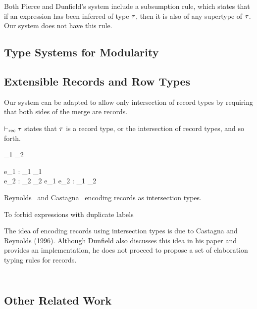 Both Pierce and Dunfield's system include a subsumption rule, which states that
if an expression has been inferred of type $ \tau $, then it is also of any
supertype of $ \tau $. Our system does not have this rule.

\subsection{Type Systems for Modularity}

\subsection{Extensible Records and Row Types}

Our system can be adapted to allow only intersection of record types by
requiring that both sides of the merge are records.

$ \vdash_{\textrm{rec}} \tau $ states that $ \tau $ is a record type, or the intersection of
record types, and so forth.


{\turnsrec \ty_1 \intersects \ty_2}

\infrule
{\Gamma \turns e_1 : \ty_1  \andalso \turnsrec \ty_1 \\
 \Gamma \turns e_2 : \ty_2  \andalso \turnsrec \ty_2}
{\Gamma \turns e_1 \dcomma e_2 : \ty_1 \intersects \ty_2 }

Reynolds~\cite{reynolds1997design} and Castagna~\cite{castagna1995calculus} encoding records as intersection types.

To forbid expressions with duplicate labels

\cite{cardelli1992extensible}

The idea of encoding records using intersection types is due to Castagna and
Reynolds (1996). Although Dunfield also discusses this idea in his paper
\cite{dunfield2014elaborating} and provides an implementation, he does not
proceed to propose a set of elaboration typing rules for records.

\begin{lstlisting}
\end{lstlisting}

\begin{lstlisting}
\end{lstlisting}

\subsection{Other Related Work}

